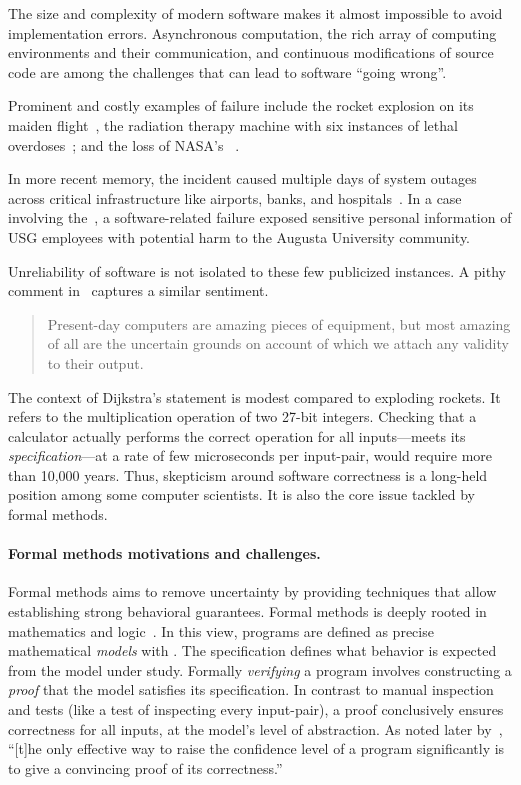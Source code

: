 The size and complexity of modern software makes it almost impossible to avoid
implementation errors. Asynchronous computation, the rich array of computing
environments and their communication, and continuous modifications of source
code are among the challenges that can lead to software \enquote{going wrong}.

Prominent and costly examples of failure include the  rocket
explosion on its maiden flight~\cite{ariane5}, the  radiation
therapy machine with six instances of lethal overdoses~\cite{leveson1993}; and
the loss of NASA's ~\cite{mars1999}.

In more recent memory, the  incident caused multiple days of
system outages across critical infrastructure like airports, banks, and
hospitals~\cite{crowdstrike}. In a case involving the~\textcite{usg2024}, a
software-related failure exposed sensitive personal information of USG employees
with potential harm to the Augusta University community.

Unreliability of software is not isolated to these few publicized instances.
A pithy comment in~\textcite[p. 3]{dijkstra1970} captures a similar sentiment.

\begin{quotation}
\noindent{}Present-day computers are amazing pieces of equipment, but most
amazing of all are the uncertain grounds on account of which we attach any
validity to their output.
\end{quotation}

The context of Dijkstra's statement is modest compared to exploding rockets. It
refers to the multiplication operation of two 27-bit integers. Checking that a
calculator actually performs the correct operation for all inputs---\ie meets
its \emph{specification}---at a rate of few microseconds
per input-pair, would require more than 10,000 years. Thus, skepticism around
software correctness is a long-held position among some computer scientists. It
is also the core issue tackled by formal methods.

\paragraph*{Formal methods motivations and challenges.}
Formal methods aims to remove uncertainty by providing techniques that allow
establishing strong behavioral guarantees. Formal methods is deeply rooted in
mathematics and logic~\cite{shankar2023}. In this view, programs are defined as
precise mathematical \emph{models} with . The specification
defines what behavior is expected from the model under study. Formally
\emph{verifying} a program involves constructing a
\emph{proof} that the model satisfies its specification. In contrast to manual
inspection and tests (like a test of inspecting every input-pair), a proof
conclusively ensures correctness for all inputs, at the model's level of
abstraction. As noted later by~\textcite{dijkstra1972}, \enquote{{[t]he only
effective way to raise the confidence level of a program significantly is to
give a convincing proof of its correctness.}}

